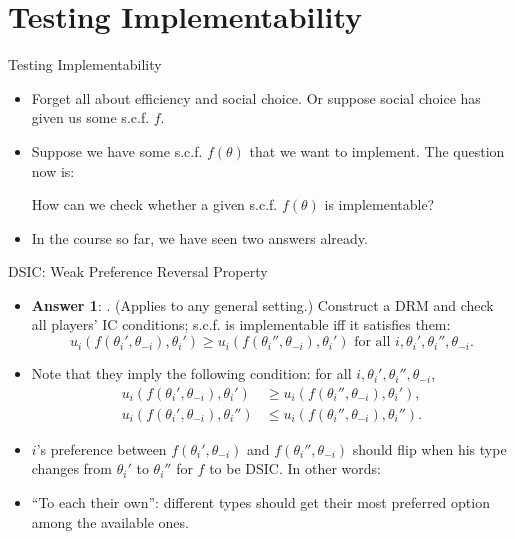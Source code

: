 \documentclass[english,10pt
,aspectratio=169
]{beamer}
\begin{document}
\section{Testing Implementability}

\begin{frame}{Testing Implementability}
	\begin{itemize}
		\item Forget all about efficiency and social choice. Or suppose social choice has given us some s.c.f. $f$.
		\item Suppose we have some s.c.f. $f(\theta)$ that we want to implement. The question now is:
		\begin{exampleblock}{}
			How can we check whether a given s.c.f. $f(\theta)$ is implementable?
		\end{exampleblock} 
		\item In the course so far, we have seen two answers already.
	\end{itemize}
\end{frame}


\begin{frame}{DSIC: Weak Preference Reversal Property}
	\begin{itemize}
		\item \textbf{Answer 1}: . (Applies to any \alert{general} setting.)
		Construct a DRM and check all players' \alert{IC conditions}; s.c.f. is implementable iff it satisfies them:
		$$ u_{i}(f(\theta_{i}', \theta_{-i}), \theta_{i}') \geq u_{i}(f(\theta_{i}'', \theta_{-i}), \theta_{i}') \text{ for all } i,\theta_i',\theta_i'',\theta_{-i}.$$
		
		\item Note that they imply the following  condition: for all $i,\theta_i',\theta_i'',\theta_{-i}$,
		\begin{align*}
			u_{i}(f(\theta_{i}', \theta_{-i}), \theta_{i}') &\geq u_{i}(f(\theta_{i}'', \theta_{-i}), \theta_{i}'),
			\\
			u_{i}(f(\theta_{i}', \theta_{-i}), \theta_{i}'') &\leq u_{i}(f(\theta_{i}'', \theta_{-i}), \theta_{i}'').
		\end{align*}
		\item $i$'s preference between $f(\theta_{i}', \theta_{-i})$ and $f(\theta_{i}'', \theta_{-i})$ should flip when his type changes from $\theta_i'$ to $\theta_i''$ for $f$ to be DSIC. In other words:
		\item ``To each their own'': different types should get their most preferred option among the available ones.
	\end{itemize}
\end{frame}
\end{document}
